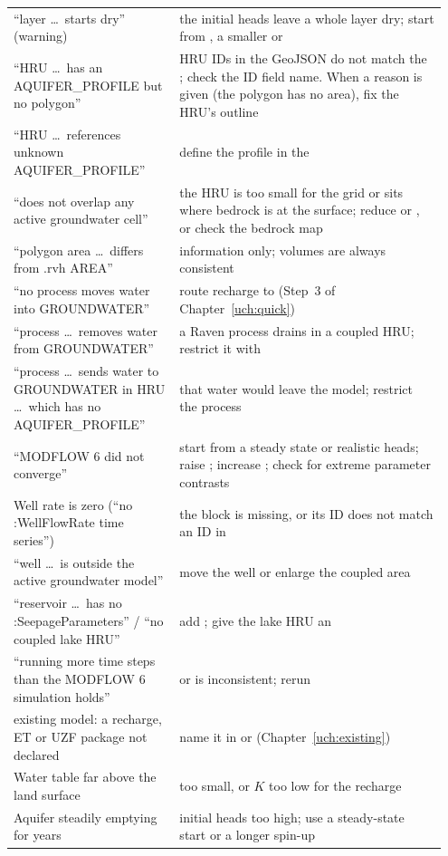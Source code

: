 \begin{longtable}{P{0.36\linewidth}P{0.588\linewidth}}
``layer \dots\ starts dry'' (warning) & the initial heads leave a whole layer dry; start from , a smaller  or \\
``HRU \dots\ has an AQUIFER\_PROFILE but no polygon'' & HRU IDs in the GeoJSON do not match the ; check the ID field name. When a reason is given (the polygon has no area), fix the HRU's outline\\
``HRU \dots\ references unknown AQUIFER\_PROFILE'' & define the profile in the \\
``does not overlap any active groundwater cell'' & the HRU is too small for the grid or sits where bedrock is at the surface; reduce  or , or check the bedrock map\\
``polygon area \dots\ differs from .rvh AREA'' & information only; volumes are always consistent\\
``no process moves water into GROUNDWATER'' & route recharge to  (Step~3 of Chapter~\ref{uch:quick})\\
``process \dots\ removes water from GROUNDWATER'' & a Raven process drains  in a coupled HRU; restrict it with \\
``process \dots\ sends water to GROUNDWATER in HRU \dots\ which has no AQUIFER\_PROFILE'' & that water would leave the model; restrict the process\\
``MODFLOW 6 did not converge'' & start from a steady state or realistic heads; raise ; increase ; check for extreme parameter contrasts\\
Well rate is zero (``no :WellFlowRate time series'') & the  block is missing, or its ID does not match an ID in \\
``well \dots\ is outside the active groundwater model'' & move the well or enlarge the coupled area\\
``reservoir \dots\ has no :SeepageParameters'' / ``no coupled lake HRU'' & add ; give the lake HRU an \\
``running more time steps than the MODFLOW 6 simulation holds'' &  or  is inconsistent; rerun\\
existing model: a recharge, ET or UZF package not declared & name it in  or  (Chapter~\ref{uch:existing})\\
Water table far above the land surface &  too small, or $K$ too low for the recharge\\
Aquifer steadily emptying for years & initial heads too high; use a steady-state start or a longer spin-up\\\bottomrule
\end{longtable}

